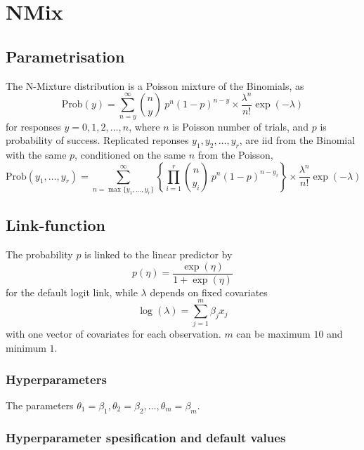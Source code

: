 \documentclass[a4paper,11pt]{article}
\def\mmax{10}
\begin{document}
\section*{NMix}

\subsection*{Parametrisation}

The N-Mixture distribution is a Poisson mixture of the Binomials, as
\begin{displaymath}
    \text{Prob}(y) = \sum_{n=y}^{\infty} {n \choose y} \ p^n
    (1-p)^{n-y} \times \frac{\lambda^{n}}{n!}\exp(-\lambda)
\end{displaymath}
for responses $y=0, 1, 2, \ldots,n$, where $n$ is Poisson number of
trials, and $p$ is probability of success. Replicated reponses
$y_1, y_2, \ldots, y_r$, are iid from the Binomial with the same $p$,
conditioned on the same $n$ from the Poisson,
\begin{displaymath}
    \text{Prob}(y_1, \ldots, y_r) = \sum_{n=\max\{y_1, \ldots,
        y_r\}}^{\infty} \left\{\prod_{i=1}^{r}
    {n \choose y_i} \ p^n
    (1-p)^{n-y_i}\right\} \times \frac{\lambda^{n}}{n!}\exp(-\lambda)
\end{displaymath}

\subsection*{Link-function}

The probability $p$ is linked to the linear predictor by
\begin{displaymath}
    p(\eta) = \frac{\exp(\eta)}{1+\exp(\eta)}
\end{displaymath}
for the default logit link, while $\lambda$ depends on fixed
covariates
\begin{displaymath}
    \log(\lambda) = \sum_{j=1}^{m} \beta_j x_j
\end{displaymath}
with one vector of covariates for each observation. $m$ can be maximum
$\mmax$ and minimum $1$.

\subsubsection*{Hyperparameters}
The parameters
$\theta_1=\beta_1, \theta_2=\beta_2, \ldots, \theta_m=\beta_m$.

\subsubsection*{Hyperparameter spesification and default values}

\end{document}

